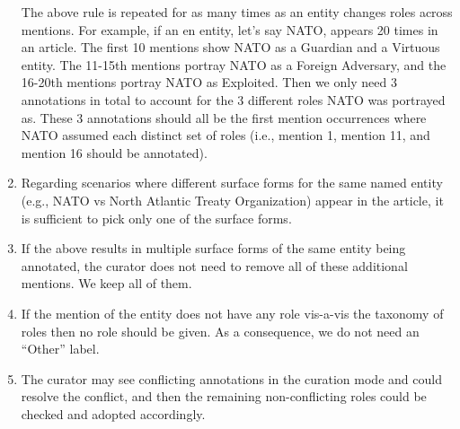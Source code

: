 \begin{enumerate}
The above rule is repeated for as many times as an entity changes roles across mentions. For example, if an en entity, let's say NATO, appears 20 times in an article. The first 10 mentions show NATO as a Guardian and a Virtuous entity. The 11-15th mentions portray NATO as a Foreign Adversary, and the 16-20th mentions portray NATO as Exploited. Then we only need 3 annotations in total to account for the 3 different roles NATO was portrayed as. These 3 annotations should all be the first mention occurrences where NATO assumed each distinct set of roles (i.e., mention 1, mention 11, and mention 16 should be annotated).
    \item Regarding scenarios where different surface forms for the same named entity (e.g., NATO vs North Atlantic Treaty Organization) appear in the article, it is sufficient to pick only one of the surface forms.
    \item If the above results in multiple surface forms of the same entity being annotated, the curator does not need to remove all of these additional mentions. We keep all of them.
    \item If the mention of the entity does not have any role vis-a-vis the taxonomy of roles then no role should be given. As a consequence, we do not need an ``Other'' label. 
    \item The curator may see conflicting annotations in the curation mode and could resolve the conflict, and then the remaining non-conflicting roles could be checked and adopted accordingly. 


\end{enumerate}

